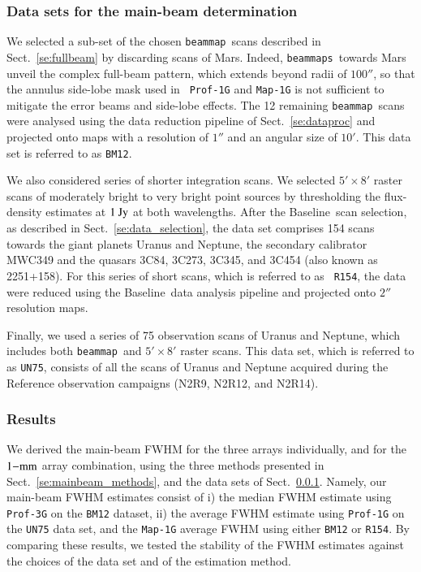 \documentclass[traditionalabstract]{aa}
\newcommand{\bm}{{\tt beammap}}
\newcommand{\bms}{{\tt beammaps}}
\newcommand{\baseline}{Baseline}%
\newcommand{\lp}[1]{#1}
\begin{document}
{\subsubsection{Data sets for the main-beam determination}
\label{se:mainbeam_dataset}

We selected a sub-set of the chosen \bm\ scans described in
Sect.~\ref{se:fullbeam} by discarding scans of Mars. {\lp Indeed, \bms\
towards Mars unveil the complex full-beam pattern, which extends beyond
radii of $100''$, so that the annulus side-lobe mask used in {\tt
Prof-1G} and {\tt Map-1G} is not sufficient to mitigate the error
beams and side-lobe effects.}
The 12 remaining \bm\ scans were analysed using the data reduction
pipeline of Sect.~\ref{se:dataproc} and projected onto maps
with a resolution of $1''$ and an angular size of $10'$. This data set
is referred to as {\tt BM12}.

We also considered series of shorter integration scans. We selected
$5' \times 8'$ raster scans of moderately bright to very bright point
sources by thresholding the flux-density estimates at $1~\rm{Jy}$ at both
wavelengths.
After the \baseline\ scan selection, as described in
Sect.~\ref{se:data_selection}, the data set comprises 154 %
scans towards the giant planets Uranus and Neptune, the secondary calibrator
MWC349 and the quasars 3C84, 3C273, 3C345, and 3C454 (also known as
2251+158). For this series of short scans, which is referred to as {\tt
R154}, the data were reduced using the \baseline\ data analysis pipeline and projected onto $2''$
resolution maps. 

{\lp Finally, we used a series of 75 observation scans of Uranus and
Neptune, which includes both \bm\ and $5' \times 8'$ raster scans. 
This data set, which is referred to as {\tt UN75}, consists of all the
scans of Uranus and Neptune acquired during the Reference
observation campaigns (N2R9, N2R12, and N2R14).}


\subsubsection{Results}
\label{se:mainbeam_results}

We derived the main-beam FWHM for the three arrays individually, and for the
$1\rm{-mm}$ array combination, using the three methods presented in
Sect.~\ref{se:mainbeam_methods}, and the data
sets of Sect.~\ref{se:mainbeam_dataset}.
Namely, our main-beam FWHM estimates
consist of i) the median FWHM estimate using {\tt Prof-3G} on the
{\tt BM12} dataset, ii) the average FWHM estimate using {\tt Prof-1G}
on the {\tt UN75} data set, and the {\tt Map-1G} average FWHM using
either {\tt BM12} or {\tt R154}. 
By comparing these results, we tested the stability of the FWHM
estimates against the choices of the data set and of the estimation
method. 

}
\end{document}
